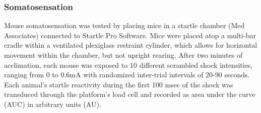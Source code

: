 \subsubsection{Somatosensation}
Mouse somatosensation was tested by placing mice in a startle
chamber (Med Associates) connected to Startle Pro Software. Mice were placed
atop a multi-bar cradle within a ventilated plexiglass restraint cylinder, which
allows for horizontal movement within the chamber, but not upright rearing.
After two minutes of acclimation, each mouse was exposed to 10 different
scrambled shock intensities, ranging from 0 to 0.6mA with randomized inter-trial
intervals of 20-90 seconds. Each animal’s startle reactivity during the first
100 msec of the shock was transduced through the platform’s load cell and
recorded as area under the curve (AUC) in arbitrary units (AU). 
